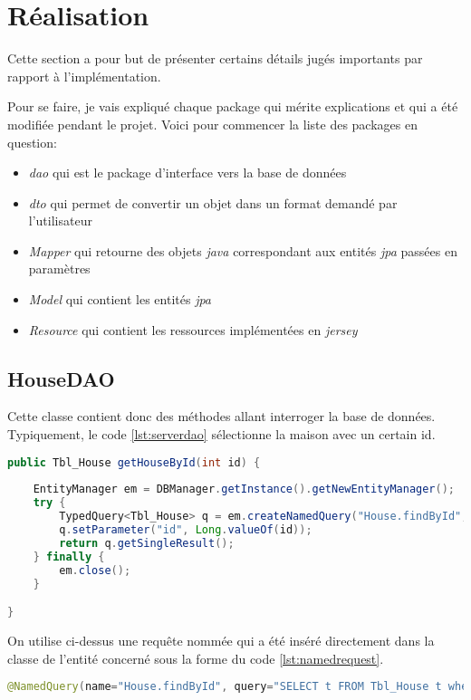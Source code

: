 
\section{Réalisation}
Cette section a pour but de présenter certains détails jugés importants par rapport à l'implémentation.

\medskip

Pour se faire, je vais expliqué chaque package qui mérite explications et qui a été modifiée pendant le projet. Voici pour commencer la liste des packages en question: 

\medskip

\begin{itemize}
	\item \emph{\gls{dao}} qui est le package d'interface vers la base de données
	\item \emph{\gls{dto}} qui permet de convertir un objet dans un format demandé par l'utilisateur
	\item \emph{Mapper} qui retourne des objets \emph{\gls{java}} correspondant aux entités \emph{\gls{jpa}} passées en paramètres
	\item \emph{Model} qui contient les entités \emph{\gls{jpa}}
	\item \emph{Resource} qui contient les ressources implémentées en \emph{\gls{jersey}}
\end{itemize}

\subsection{HouseDAO} %
\label{sub:housedao}
Cette classe contient donc des méthodes allant interroger la base de données. Typiquement, le code \ref{lst:serverdao} sélectionne la maison avec un certain id.
\begin{lstlisting}[language={JAVA}, caption={DAO - Maison avec id}, label={lst:serverdao}]
public Tbl_House getHouseById(int id) {
	
	EntityManager em = DBManager.getInstance().getNewEntityManager();
	try {
		TypedQuery<Tbl_House> q = em.createNamedQuery("House.findById", Tbl_House.class);
		q.setParameter("id", Long.valueOf(id));
		return q.getSingleResult();
	} finally {
		em.close();
	}

}
\end{lstlisting}

On utilise ci-dessus une requête nommée qui a été inséré directement dans la classe de l'entité concerné sous la forme du code \ref{lst:namedrequest}.

\begin{lstlisting}[language={JAVA}, caption={Requête nommée}, label={lst:namedrequest}]
@NamedQuery(name="House.findById", query="SELECT t FROM Tbl_House t where t.ho_PK_House = :id ")
\end{lstlisting}
